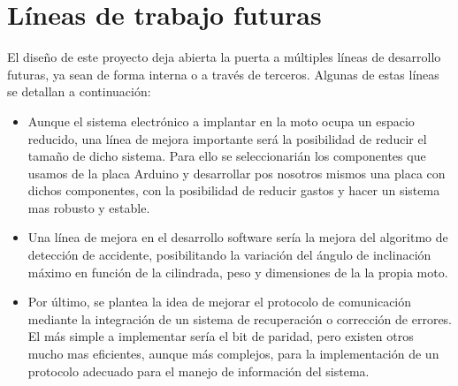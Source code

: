 	\section{L\'ineas de trabajo futuras}
	
		El dise\~no de este proyecto deja abierta la puerta a m\'ultiples l\'ineas de desarrollo futuras, ya sean de forma interna o a trav\'es de terceros. Algunas de estas l\'ineas se detallan a continuaci\'on:
		
		\begin{itemize}	
			\item Aunque el sistema electr\'onico a implantar en la moto ocupa un espacio reducido, una l\'inea de mejora importante ser\'a la posibilidad de reducir el tama\~no de dicho sistema. Para ello se seleccionari\'an los componentes que usamos de la placa Arduino y desarrollar pos nosotros mismos una placa con dichos componentes, con la posibilidad de reducir gastos y hacer un sistema mas robusto y estable. 
			
			\item Una l\'inea de mejora en el desarrollo software ser\'ia la mejora del algoritmo de detecci\'on de accidente, posibilitando la variaci\'on del \'angulo de inclinaci\'on m\'aximo en funci\'on de la cilindrada, peso y dimensiones de la la propia moto.
			
			\item Por \'ultimo, se plantea la idea de mejorar el protocolo de comunicación mediante la integraci\'on de un sistema de recuperaci\'on o correcci\'on de errores. El m\'as simple a implementar ser\'ia el bit de paridad, pero existen otros mucho mas eficientes, aunque m\'as complejos, para la implementaci\'on de un protocolo adecuado para el manejo de informaci\'on del sistema.
			
		\end{itemize}


	\newpage
	$\ $